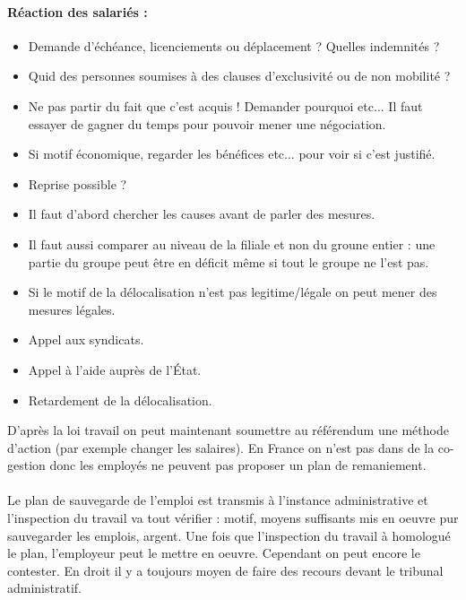 	

\paragraph{Réaction des salariés :}
	\begin{itemize}
	\item[\textbullet] Demande d'échéance, licenciements ou déplacement ? Quelles indemnités ?
	\item[\textbullet] Quid des personnes soumises à des clauses d’exclusivité ou de non mobilité ?
	\item[\textbullet] Ne pas partir du fait que c'est acquis ! Demander pourquoi etc... Il faut essayer de gagner du temps pour pouvoir mener une négociation.
	\item[\textbullet] Si motif économique, regarder les bénéfices etc... pour voir si c'est justifié.
	\item[\textbullet] Reprise possible ?
	\item[\textbullet] Il faut d'abord chercher les causes avant de parler des mesures.
	\item[\textbullet] Il faut aussi comparer au niveau de la filiale et non du groune entier : une partie du groupe peut être en déficit même si tout le groupe ne l'est pas. 
	\item[\textbullet] Si le motif de la délocalisation n'est pas legitime/légale on peut mener des mesures légales.
	\item[\textbullet] Appel aux syndicats.
	\item[\textbullet] Appel à l'aide auprès de l'État.
	\item[\textbullet] Retardement de la délocalisation.
	\end{itemize}
	
	D'après la loi travail on peut maintenant soumettre au référendum une méthode d'action (par exemple changer les salaires).
	En France on n'est pas dans de la co-gestion donc les employés ne peuvent pas proposer un plan de remaniement.

	
\paragraph{}
Le plan de sauvegarde de l'emploi est transmis à l'instance administrative et l'inspection du travail va tout vérifier : motif, moyens suffisants mis en oeuvre pur sauvegarder les emplois, argent.
Une fois que l'inspection du travail à homologué le plan, l'employeur peut le mettre en oeuvre.
Cependant on peut encore le contester.
En droit il y a toujours moyen de faire des recours devant le tribunal administratif.


